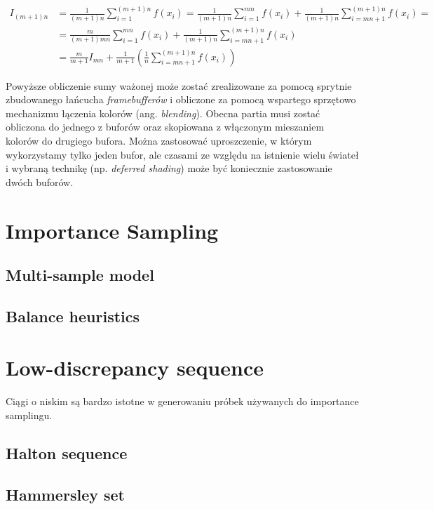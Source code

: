\documentclass[../main.tex]{subfiles}
\begin{document}
\begin{align*}
  I_{(m+1)n} &= \frac{1}{(m+1)n} \sum_{i=1}^{(m+1)n} f(x_i)
  = \frac{1}{(m+1)n} \sum_{i=1}^{mn} f(x_i)
    + \frac{1}{(m+1)n} \sum_{i=mn+1}^{(m+1)n} f(x_i) = \\
  &= \frac{m}{(m+1)mn} \sum_{i=1}^{mn} f(x_i)
    + \frac{1}{(m+1)n} \sum_{i=mn+1}^{(m+1)n} f(x_i) \\
  &= \frac{m}{m+1}I_{mn}
    + \frac{1}{m+1} \left(
        \frac{1}{n} \sum_{i=mn+1}^{(m+1)n} f(x_i)
    \right)
\end{align*}

Powyższe obliczenie sumy ważonej może zostać zrealizowane za pomocą sprytnie
zbudowanego łańcucha \textit{framebufferów} i obliczone za pomocą wspartego
sprzętowo mechanizmu łączenia kolorów (ang. \textit{blending}). Obecna partia
musi zostać obliczona do jednego z buforów oraz skopiowana z włączonym
mieszaniem kolorów do drugiego bufora. Można zastosować uproszczenie, w którym
wykorzystamy tylko jeden bufor, ale czasami ze względu na istnienie wielu
świateł i wybraną technikę (np. \textit{deferred shading}) może być koniecznie
zastosowanie dwóch buforów.

\section{Importance Sampling}


\subsection{Multi-sample model}
\subsection{Balance heuristics}

\section{Low-discrepancy sequence}

Ciągi o niskim  są bardzo istotne w generowaniu
próbek używanych do importance samplingu.

\subsection{Halton sequence}
\subsection{Hammersley set}
\end{document}
